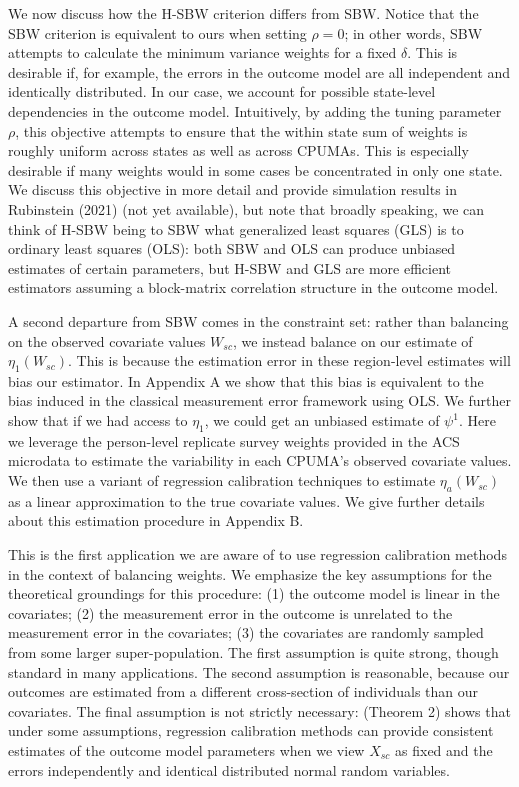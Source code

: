 \documentclass[12pt]{article}
\begin{document}
We now discuss how the H-SBW criterion differs from SBW. Notice that the SBW criterion is equivalent to ours when setting $\rho = 0$; in other words, SBW attempts to calculate the minimum variance weights for a fixed $\delta$. This is desirable if, for example, the errors in the outcome model are all independent and identically distributed. In our case, we account for possible state-level dependencies in the outcome model. Intuitively, by adding the tuning parameter $\rho$, this objective attempts to ensure that the within state sum of weights is roughly uniform across states as well as across CPUMAs. This is especially desirable if many weights would in some cases be concentrated in only one state. We discuss this objective in more detail and provide simulation results in Rubinstein (2021) (not yet available), but note that broadly speaking, we can think of H-SBW being to SBW what generalized least squares (GLS) is to ordinary least squares (OLS): both SBW and OLS can produce unbiased estimates of certain parameters, but H-SBW and GLS are more efficient estimators assuming a block-matrix correlation structure in the outcome model.

A second departure from SBW comes in the constraint set: rather than balancing on the observed covariate values $W_{sc}$, we instead balance on our estimate of $\eta_1(W_{sc})$. This is because the estimation error in these region-level estimates will bias our estimator. In Appendix A we show that this bias is equivalent to the bias induced in the classical measurement error framework using OLS. We further show that if we had access to $\eta_1$, we could get an unbiased estimate of $\psi^1$. Here we leverage the person-level replicate survey weights provided in the ACS microdata to estimate the variability in each CPUMA's observed covariate values. We then use a variant of regression calibration techniques to estimate $\eta_a(W_{sc})$ as a linear approximation to the true covariate values. We give further details about this estimation procedure in Appendix B.

This is the first application we are aware of to use regression calibration methods in the context of balancing weights. We emphasize the key assumptions for the theoretical groundings for this procedure: (1) the outcome model is linear in the covariates; (2) the measurement error in the outcome is unrelated to the measurement error in the covariates; (3) the covariates are randomly sampled from some larger super-population. The first assumption is quite strong, though standard in many applications. The second assumption is reasonable, because our outcomes are estimated from a different cross-section of individuals than our covariates. The final assumption is not strictly necessary: \cite{gleser1992importance} (Theorem 2) shows that under some assumptions, regression calibration methods can provide consistent estimates of the outcome model parameters when we view $X_{sc}$ as fixed and the errors independently and identical distributed normal random variables.
\end{document}
